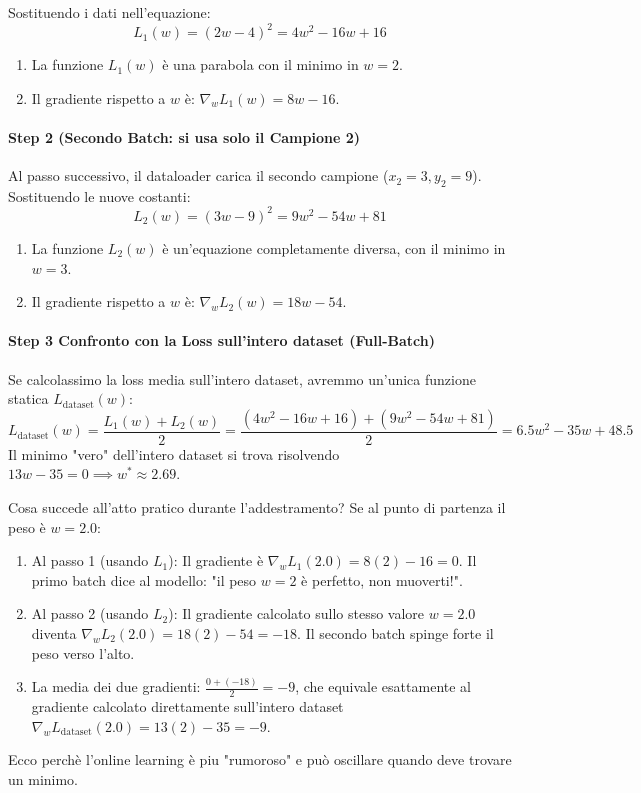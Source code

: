 Sostituendo i dati nell'equazione:
$$L_1(w) = (2w - 4)^2 = 4w^2 - 16w + 16$$
\begin{enumerate}
    \item La funzione $L_1(w)$ è una parabola con il minimo in $w = 2$.
    \item Il gradiente rispetto a $w$ è: $\nabla_w L_1(w) = 8w - 16$.
\end{enumerate}

\paragraph{Step 2 (Secondo Batch: si usa solo il Campione 2)}
Al passo successivo, il dataloader carica il secondo campione ($x_2 = 3, y_2 = 9$). Sostituendo le nuove costanti:
$$L_2(w) = (3w - 9)^2 = 9w^2 - 54w + 81$$
\begin{enumerate}
    \item La funzione $L_2(w)$ è un'equazione completamente diversa, con il minimo in $w = 3$.
    \item Il gradiente rispetto a $w$ è: $\nabla_w L_2(w) = 18w - 54$.
\end{enumerate}

\paragraph{Step 3 Confronto con la Loss sull'intero dataset (Full-Batch)}
Se calcolassimo la loss media sull'intero dataset, avremmo un'unica funzione statica $L_{\text{dataset}}(w)$:
$$L_{\text{dataset}}(w) = \frac{L_1(w) + L_2(w)}{2} = \frac{(4w^2 - 16w + 16) + (9w^2 - 54w + 81)}{2} = 6.5w^2 - 35w + 48.5$$
Il minimo "vero" dell'intero dataset si trova risolvendo $13w - 35 = 0 \implies w^* \approx 2.69$.

Cosa succede all'atto pratico durante l'addestramento?
Se al punto di partenza il peso è $w = 2.0$:
\begin{enumerate}
    \item Al passo 1 (usando $L_1$): Il gradiente è $\nabla_w L_1(2.0) = 8(2) - 16 = 0$. Il primo batch dice al modello: "il peso $w=2$ è perfetto, non muoverti!".
    \item Al passo 2 (usando $L_2$): Il gradiente calcolato sullo stesso valore $w = 2.0$ diventa $\nabla_w L_2(2.0) = 18(2) - 54 = -18$. Il secondo batch spinge forte il peso verso l'alto.
    \item La media dei due gradienti: $\frac{0 + (-18)}{2} = -9$, che equivale esattamente al gradiente calcolato direttamente sull'intero dataset $\nabla_w L_{\text{dataset}}(2.0) = 13(2) - 35 = -9$.
\end{enumerate}
Ecco perchè l'online learning è piu "rumoroso" e può oscillare quando deve trovare un minimo.


